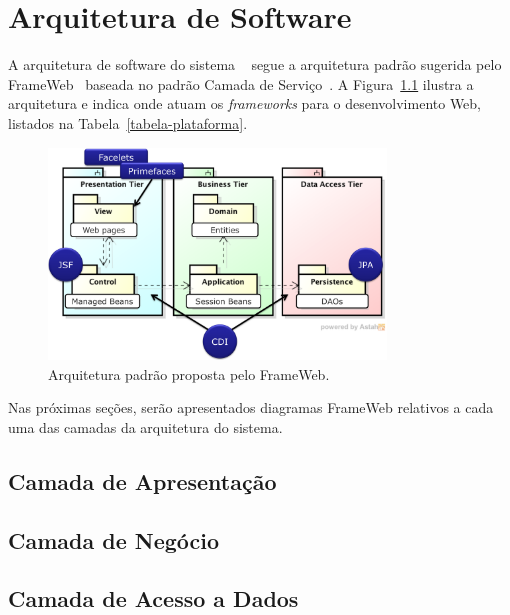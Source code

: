 
\chapter{Arquitetura de Software}
\label{sec-arquitetura}

A arquitetura de software do sistema~\imprimirtitulo \,\, segue a arquitetura padrão sugerida pelo FrameWeb~\cite{souza:masterthesis07,souza-et-al:iism09} baseada no padrão Camada de Serviço~\cite{fowler:book02}. A Figura~\ref{figura-arquitetura-padrao} ilustra a arquitetura e indica onde atuam os \textit{frameworks} para o desenvolvimento Web, listados na Tabela~\ref{tabela-plataforma}.

\begin{figure}[h]
	\centering
	\includegraphics[width=0.8\textwidth]{figuras/figura-arquitetura-padrao.png}
	\caption{Arquitetura padrão proposta pelo FrameWeb.}
	\label{figura-arquitetura-padrao}
\end{figure}

Nas próximas seções, serão apresentados diagramas FrameWeb relativos a cada uma das camadas da arquitetura do sistema.


\section{Camada de Apresentação}
\label{sec-arquitetura-apresentacao}





\section{Camada de Negócio}
\label{sec-arquitetura-negocio}





\section{Camada de Acesso a Dados}
\label{sec-arquitetura-dados}


